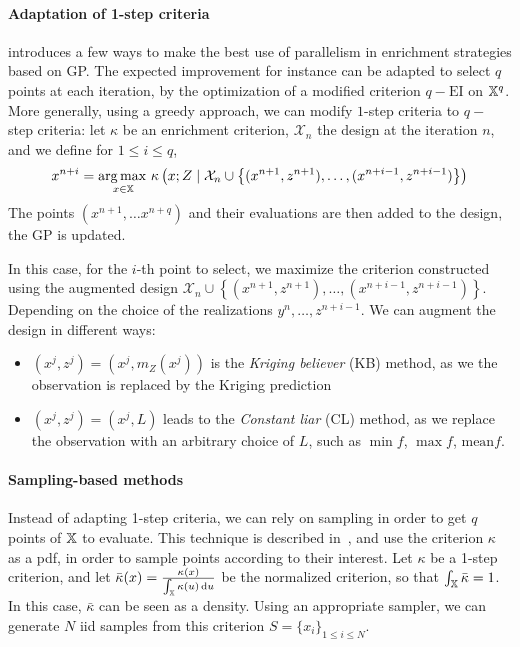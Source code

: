 \documentclass[../../Main_ManuscritThese.tex]{subfiles}
\begin{document}
\paragraph{Adaptation of 1-step criteria}

\cite{ginsbourger_kriging_2010} introduces a few ways to  make the best use of parallelism in enrichment strategies based on GP. The expected improvement for instance can be adapted to select $q$ points at each iteration, by the optimization of a modified criterion $q-\mathrm{EI}$ on $\mathbb{X}^q$. More generally, using a greedy approach, we can modify $1$-step criteria to $q-$step criteria: let $\kappa$ be an enrichment criterion, $\mathcal{X}_n$ the design at the iteration $n$,  and we define for $1\leq i \leq q$, 
\begin{equation} 
 x^{n+i} = \operatorname*{arg\,max \,}_{x \in \mathbb{X}} \kappa\left(x; Z \mid \mathcal{X}_n\cup\left\{(x^{n+1}, z^{n+1}), \dots ,( x^{n+i-1}, z^{n+i-1})\right\} \right)
\end{equation}
The points $(x^{n+1},\dots x^{n+q})$ and their evaluations are then added to the design, the GP is updated.


In this case, for the $i$-th point to select, we maximize the criterion constructed using the augmented design $\mathcal{X}_n \cup  \left\{(x^{n+1}, z^{n+1}), \dots ,( x^{n+i-1}, z^{n+i-1})\right\}$. Depending on the choice of the realizations $y^{n},\dots,z^{n+i-1}$. We can augment the design in different ways:
\begin{itemize}
\item $\left(x^j, z^j\right) = \left(x^j, m_Z(x^j)\right)$ is the \emph{Kriging believer} (KB) method, as we the observation is replaced by the Kriging prediction
\item $\left(x^j, z^j\right) = \left(x^j, L\right)$ leads to the \emph{Constant liar} (CL) method, as we replace the observation with an arbitrary choice of $L$, such as $\min f$, $\max f$, $\mathrm{mean} f$.
\end{itemize}

\paragraph{Sampling-based methods}
\label{sec:sampling_based_criterion}
Instead of adapting 1-step criteria, we can rely on sampling in order to get $q$ points of $\mathbb{X}$ to evaluate.
This technique is described in~\cite{dubourg_reliability-based_2011}, and use the criterion $\kappa$ as a pdf, in order to sample points according to their interest.
Let $\kappa$ be a 1-step criterion, and let $\bar{\kappa}(x) = \frac{\kappa(x)}{\int_{\mathbb{X}}\kappa(u)\,\mathrm{d}u}$ be the normalized criterion, so that $\int_{\mathbb{X}} \bar{\kappa}=1$. In this case, $\bar{\kappa}$ can be seen as a density.  Using an appropriate sampler, we can generate $N$ iid samples from this criterion $S=\{x_i\}_{1\leq i \leq N}$. 
  
\end{document}
